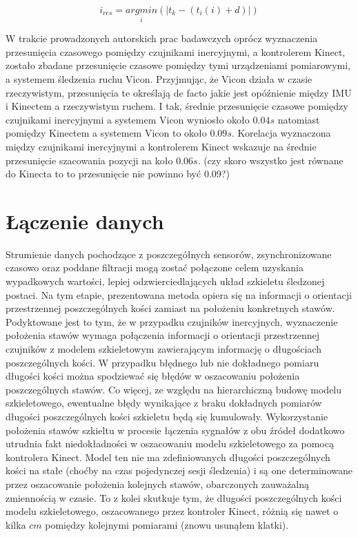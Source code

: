 \begin{equation}
i_{res} = \underset{i}{argmin}(|t_k-(t_i(i) + d)|)
\label{eq:dec}
\end{equation}

W trakcie prowadzonych autorskich prac badawczych oprócz wyznaczenia przesunięcia czasowego pomiędzy czujnikami inercyjnymi, a kontrolerem Kinect, zostało zbadane przesunięcie czasowe pomiędzy tymi urządzeniami pomiarowymi, a systemem śledzenia ruchu Vicon. Przyjmując, że Vicon działa w czasie rzeczywistym, przesunięcia te określają de facto jakie jest opóźnienie między IMU i Kinectem a rzeczywistym ruchem. I tak, średnie przesunięcie czasowe pomiędzy czujnikami inercyjnymi a systemem Vicon wyniosło około $0.04s$ natomiast pomiędzy Kinectem a systemem Vicon to około $0.09s$. Korelacja wyznaczona między czujnikami inercyjnymi a kontrolerem Kinect wskazuje na średnie przesunięcie szacowania pozycji na koło $0.06s$. (czy skoro wszystko jest równane do Kinecta to to przesunięcie nie powinno być 0.09?)

\section{Łączenie danych}

Strumienie danych pochodzące z poszczegółnych sensorów, zsynchronizowane czasowo oraz poddane filtracji mogą zostać połączone celem uzyskania wypadkowych wartości, lepiej odzwierciedlających układ szkieletu śledzonej postaci. Na tym etapie, prezentowana metoda opiera się na informacji o orientacji przestrzennej poszczególnych kości zamiast na położeniu konkretnych stawów. Podyktowane jest to tym, że w przypadku czujników inercyjnych, wyznaczenie położenia stawów wymaga połączenia informacji o orientacji przestrzennej czujników z modelem szkieletowym zawierającym informację o długościach poszczególnych kości. W przypadku błędnego lub nie dokładnego pomiaru długości kości można spodziewać się błędów w oszacowaniu położenia poszczególnych stawów. Co więcej, ze względu na hierarchiczną budowę modelu szkieletowego, ewentualne błędy wynikające z braku dokładnych pomiarów długości poszczególnych kości szkieletu będą się kumulowały. 
Wykorzystanie położenia stawów szkieltu w procesie łączenia sygnałów z obu źródeł dodatkowo utrudnia fakt niedokładności w oszacowaniu modelu szkieletowego za pomocą kontrolera Kinect. Model ten nie ma zdefiniowanych długości poszczególnych kości na stałe (choćby na czas pojedynczej sesji śledzenia) i są one determinowane przez oszacowanie położenia kolejnych stawów, obarczonych zauważalną zmiennością w czasie. To z kolei skutkuje tym, że długości poszczególnych kości modelu szkieletowego, oszacowanego przez kontroler Kinect, różnią się nawet o kilka $cm$ pomiędzy kolejnymi pomiarami (znowu usunąłem klatki).\\


